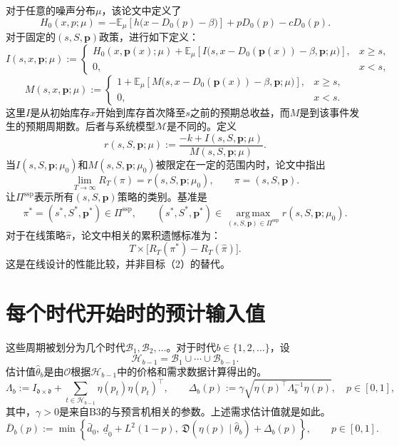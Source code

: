 \documentclass[11pt]{article}
\begin{document}
对于任意的噪声分布\(\mu\)，该论文中定义了
\begin{equation}
H_0(x,p;\mu)
=-\mathbb{E}_{\mu}\!\left[h\bigl(x-D_0(p)-\beta\bigr)\right]
+pD_0(p)-cD_0(p).
\tag{4}
\end{equation}
对于固定的\((s,S,\boldsymbol p)\)政策，进行如下定义：
\begin{equation}
I(s,x,\boldsymbol p;\mu):=
\begin{cases}
H_0(x,\boldsymbol p(x);\mu)
+\mathbb{E}_{\mu}\!\left[
 I\bigl(s,x-D_0(\boldsymbol p(x))-\beta,\boldsymbol p;\mu\bigr)
\right],&x\geq s,\\
0,&x<s,
\end{cases}
\tag{5}
\end{equation}
\begin{equation}
M(s,x,\boldsymbol p;\mu):=
\begin{cases}
1+\mathbb{E}_{\mu}\!\left[
 M\bigl(s,x-D_0(\boldsymbol p(x))-\beta,\boldsymbol p;\mu\bigr)
\right],&x\geq s,\\
0,&x<s.
\end{cases}
\tag{6}
\end{equation}
这里\(I\)是从初始库存\(x\)开始到库存首次降至\(s\)之前的预期总收益，而\(M\)是到该事件发生的预期周期数。后者与系统模型\(\mathcal M\)是不同的。定义
\begin{equation}
r(s,S,\boldsymbol p;\mu):=
\frac{-k+I(s,S,\boldsymbol p;\mu)}{M(s,S,\boldsymbol p;\mu)}.
\tag{7}
\end{equation}
当\(I(s,S,\boldsymbol p;\mu_0)\)和\(M(s,S,\boldsymbol p;\mu_0)\)被限定在一定的范围内时，论文中指出
\[
\lim_{T\to\infty}R_T(\pi)=r(s,S,\boldsymbol p;\mu_0),
\qquad \pi=(s,S,\boldsymbol p).
\]
让\(\Pi^{\mathrm{ssp}}\)表示所有\((s,S,\boldsymbol p)\)策略的类别。基准是
\[
\pi^*=(s^*,S^*,\boldsymbol p^*)\in\Pi^{\mathrm{ssp}},
\qquad
(s^*,S^*,\boldsymbol p^*)\in
\operatorname*{arg\,max}_{(s,S,\boldsymbol p)\in\Pi^{\mathrm{ssp}}}
 r(s,S,\boldsymbol p;\mu_0).
\]
对于在线策略\(\widehat\pi\)，论文中相关的累积遗憾标准为：
\begin{equation}
T\times\bigl[R_T(\pi^*)-R_T(\widehat\pi)\bigr].
\tag{3}
\end{equation}
这是在线设计的性能比较，并非目标（2）的替代。

\section*{每个时代开始时的预计输入值}
这些周期被划分为几个时代\(\mathcal B_1,\mathcal B_2,\ldots\)。对于时代\(b\in\{1,2,\ldots\}\)，设
\[
\mathcal H_{b-1}=\mathcal B_1\cup\cdots\cup\mathcal B_{b-1}.
\]
估计值\(\widehat\theta_b\)是由\(\mathcal O\)根据\(\mathcal H_{b-1}\)中的价格和需求数据计算得出的。
\[
\Lambda_b:=I_{\mathfrak d\times\mathfrak d}
+\sum_{t\in\mathcal H_{b-1}}\eta(p_t)\eta(p_t)^\top,
\qquad
\Delta_b(p):=\gamma\sqrt{\eta(p)^\top\Lambda_b^{-1}\eta(p)},
\quad p\in[0,1],
\]
其中，\(\gamma>0\)是来自B3的与预言机相关的参数。上述需求估计值就是如此。
\begin{equation}
\overline D_b(p):=
\min\left\{\bar d_0,\ \underline d_0+L^2(1-p),\
\mathfrak D(\eta(p)\mid\widehat\theta_b)+\Delta_b(p)\right\},
\qquad p\in[0,1].
\tag{11}
\end{equation}
\end{document}
